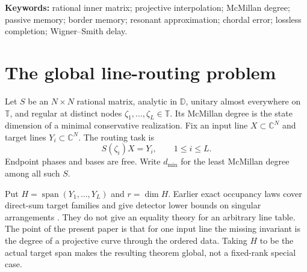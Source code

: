 \documentclass[11pt]{article}
\theoremstyle{definition}\newtheorem{definition}[theorem]{Definition}\newtheorem{example}[theorem]{Example}
\theoremstyle{remark}\newtheorem{remark}[theorem]{Remark}\newtheorem{limitation}[theorem]{Limitation}
\newcommand{\C}{\mathbb C}\newcommand{\D}{\mathbb D}\newcommand{\T}{\mathbb T}
\begin{document}
\begin{abstract}
The closure phase has an operational cost.  If
$d_\partial\le d<d_{\min}$, then arbitrarily accurate degree-$d$ routers exist
but every such approximating sequence has divergent peak Wigner--Smith delay,
$\|\operatorname{tr}Q\|_\infty\to\infty$.  Under any finite peak-delay cap the
best error is strictly positive and attained.  Thus the exact trichotomy is
physical as well as algebraic: robust positive-error phase, singular high-delay
border phase, and exact finite-delay phase.  In the planar stratum we additionally
solve degree zero by the smallest Bloch-sphere cap, prove the exact binary
occupancy law, classify all four-node tables by multiplicity and cross-ratio,
and certify a strict $21\%$ one-state error barrier.  Exact artifacts and an
independent verifier accompany the theorem fixtures.  Classical rational
interpolation and lossless completion are credited as ingredients; the result
claimed here is their global state--error--delay synthesis.
\end{abstract}

\noindent\textbf{Keywords:} rational inner matrix; projective interpolation;
McMillan degree; passive memory; border memory; resonant approximation;
chordal error; lossless completion; Wigner--Smith delay.

\section{The global line-routing problem}

Let $S$ be an $N\times N$ rational matrix, analytic in $\D$, unitary almost
everywhere on $\T$, and regular at distinct nodes
$\zeta_1,\ldots,\zeta_L\in\T$.  Its McMillan degree is the state dimension of a
minimal conservative realization.  Fix an input line $X\subset\C^N$ and target
lines $Y_i\subset\C^N$.  The routing task is
\begin{equation}\label{eq:routing}
                              S(\zeta_i)X=Y_i,
                              \qquad 1\le i\le L.
\end{equation}
Endpoint phases and bases are free.  Write $d_{\min}$ for the least McMillan
degree among all such $S$.

Put $H=\operatorname{span}(Y_1,\ldots,Y_L)$ and $r=\dim H$.  Earlier exact
occupancy laws cover direct-sum target families and give detector lower bounds
on singular arrangements \cite{ErikssonUnified2026}.  They do not give an
equality theory for an arbitrary line table.  The point of the present paper is
that for one input line the missing invariant is the degree of a projective
curve through the ordered data.  Taking $H$ to be the actual target span makes
the resulting theorem global, not a fixed-rank special case.
\end{document}
